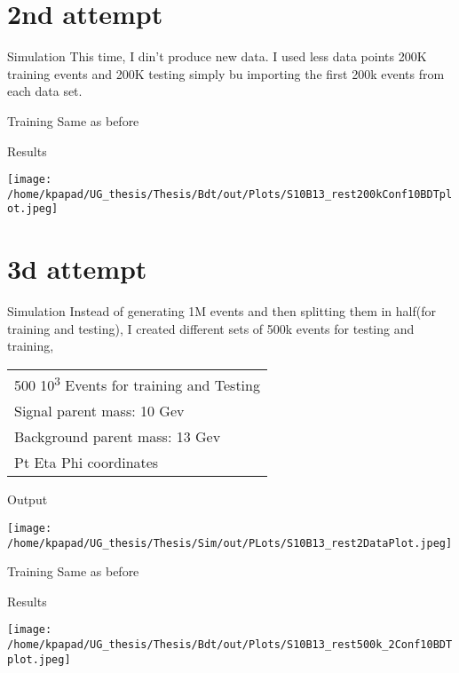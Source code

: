 \documentclass[bigger]{beamer}
\begin{document}
\section{2nd attempt}
\label{sec:org1fc0647}
\begin{frame}[label={sec:org9c7b4d6}]{Simulation}
This time, I din't produce new data. I used less data points 200K training events and 200K testing simply bu importing the first 200k events from each data set.
\end{frame}
\begin{frame}[label={sec:orgec47dc0}]{Training}
Same as before 
\end{frame}
\begin{frame}[label={sec:orgb3c392c}]{Results}
\begin{center}
\texttt{[image: /home/kpapad/UG\_thesis/Thesis/Bdt/out/Plots/S10B13\_rest200kConf10BDTplot.jpeg]}
\end{center}
\end{frame}
\section{3d attempt}
\label{sec:orgd405665}
\begin{frame}[label={sec:org11d5bf8}]{Simulation}
Instead of generating 1M events and then splitting them in half(for training and testing), I created different sets of 500k events for testing and training,
\begin{center}
\begin{tabular}{l}
500 \texttimes{} 10\textsuperscript{3} Events for training and Testing\\
Signal parent mass: 10 Gev\\
Background parent mass: 13 Gev\\
Pt Eta Phi coordinates\\
\end{tabular}
\end{center}
\end{frame}
\begin{frame}[label={sec:orga234fad}]{Output}
\begin{center}
\texttt{[image: /home/kpapad/UG\_thesis/Thesis/Sim/out/PLots/S10B13\_rest2DataPlot.jpeg]}
\end{center}
\end{frame}
\begin{frame}[label={sec:orga3c4509}]{Training}
Same as before
\end{frame}
\begin{frame}[label={sec:org868add6}]{Results}
\begin{center}
\texttt{[image: /home/kpapad/UG\_thesis/Thesis/Bdt/out/Plots/S10B13\_rest500k\_2Conf10BDTplot.jpeg]}
\end{center}
\end{frame}
\end{document}
